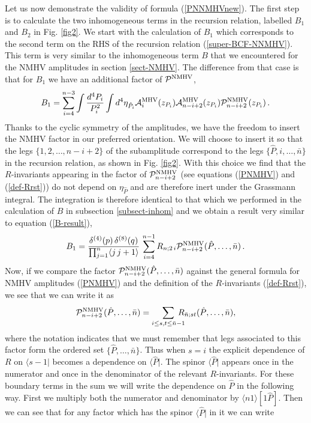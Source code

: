 \documentclass[12pt]{article}
\def \be  {\begin{equation}}
\def \ee  {\end{equation}}
\def\l<{\langle}\def\r>{\rangle}
\begin{document}
Let us now demonstrate the validity of formula (\ref{PNNMHVnew}). The first step is to calculate the two inhomogeneous terms in the recursion relation, labelled $B_1$ and $B_2$ in Fig. \ref{fig2}. We start with the calculation of $B_1$ which corresponds to the second term on the RHS of the recursion relation (\ref{super-BCF-NNMHV}). This term is very similar to the inhomogeneous term $B$ that we encountered for the NMHV amplitudes in section \ref{sect-NMHV}. The difference from that case is that for $B_1$ we have an additional factor of $\mathcal{P}^{\rm NMHV}$,
\be
B_1= \sum_{i=4}^{n-3}  \int \frac{d^{4}P_{i}}{P_{i}^2}
\int d^{4}\eta_{\hat{P}_{i}} \mathcal{A}_{i}^{\rm MHV}(z_{P_{i}})
\mathcal{A}_{n-i+2}^{\rm MHV}(z_{P_{i}}) \mathcal{P}_{n-i+2}^{\rm NMHV}(z_{P_{i}}) \, .
\ee
Thanks to the cyclic symmetry of the amplitudes, we have the freedom to insert the NMHV factor in our preferred orientation. We will choose to insert it so that the legs $\{ 1,2,\ldots,n-i+2 \}$ of the subamplitude correspond to the legs $\{ \hat{P},i,\ldots ,\bar{n} \}$ in the recursion relation, as shown in Fig. \ref{fig2}. With this choice we find that the $R$-invariants appearing in the factor of $\mathcal{P}^{\rm NMHV}_{n-i+2}$ (see equations (\ref{PNMHV}) and (\ref{def-Rrst})) do not depend on $\eta_{\hat{P}}$ and are therefore inert under the Grassmann integral. The integration is therefore identical to that which we performed in the calculation of $B$ in subsection \ref{subsect-inhom} and we obtain a result very similar to equation (\ref{B-result}),
\be
\label{B1-inter}
B_1 = \frac{ \delta^{(4)}(p) \,
\delta^{(8)}(q)}{\prod_{j=1}^{n} \langle j \, j+1 \rangle } \,
\sum_{i=4}^{n-1} R_{n;2\,i} \mathcal{P}_{n-i+2}^{\rm NMHV}(\hat{P},\ldots,\bar{n})\,.
\ee
Now, if we compare the factor $\mathcal{P}_{n-i+2}^{\rm NMHV}(\hat{P},\ldots,\bar{n})$ against the general formula for NMHV amplitudes (\ref{PNMHV}) and the definition of the $R$-invariants (\ref{def-Rrst}), we see that we can write it as
\be
\mathcal{P}^{\rm NMHV}_{n-i+2}(\hat{P},\ldots,\bar{n}) = \sum_{i \leq s,t \leq \bar{n}-1} \!\!\!\!\!\! R_{\bar{n};st}(\hat{P},\ldots,\bar{n}),
\label{Phatsum}
\ee
where the notation indicates that we must remember that legs associated to this factor form the ordered set $\{ \hat{P},\ldots,\bar{n} \}$. Thus when $s=i$ the explicit dependence of $R$ on $\langle s-1|$ becomes a dependence on $\langle \hat{P} |$. The spinor $\langle \hat{P} |$ appears once in the numerator and once in the denominator of the relevant $R$-invariants. For these boundary terms in the sum we will write the dependence on $\hat{P}$ in the following way. First we multiply both the numerator and denominator by $\l< n 1 \r>[1\hat{P}]$. Then we can see that for any factor which has the spinor $\langle \hat{P}|$ in it we can write
\end{document}
